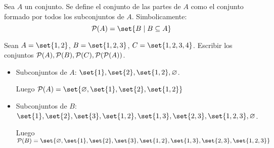 \begin{definition}
	Sea \(A \) un conjunto. Se define el conjunto de las partes de \(A \) como el conjunto formado por todos los subconjuntos de \(A \). Simbolicamente:
	\[
		\mathcal{\MakeUppercase{P}}(A) = \set{B \mid B \subseteq A }
	\]
\end{definition}
\begin{example}
	Sean \(A = \set{1,2}\), \(B = \set{1,2,3}\), \(C = \set{1,2,3,4}\). Escribir los conjuntos \(\mathcal{\MakeUppercase{P}}(A), \mathcal{\MakeUppercase{P}}(B), \mathcal{\MakeUppercase{P}}(C), \mathcal{\MakeUppercase{P}}(\mathcal{\MakeUppercase{P}}(A))\).
	\begin{itemize}
		\item Subconjuntos de \(A \): \(\set{1}, \set{2}, \set{1,2}, \varnothing\).

		      Luego \(\mathcal{\MakeUppercase{p}}(A) = \set{\varnothing, \set{1}, \set{2},\set{1,2}}\)

		\item Subconjuntos de \(B \): \(\set{1},\set{2},\set{3},\set{1,2}, \set{1,3}, \set{2,3}, \set{1,2,3}, \varnothing\).

		      Luego \(\mathcal{\MakeUppercase{p}}(B) = \set{\varnothing, \set{1}, \set{2}, \set{3}, \set{1,2}, \set{1,3}, \set{2,3}, \set{1,2,3}}\)
	\end{itemize}
\end{example}

